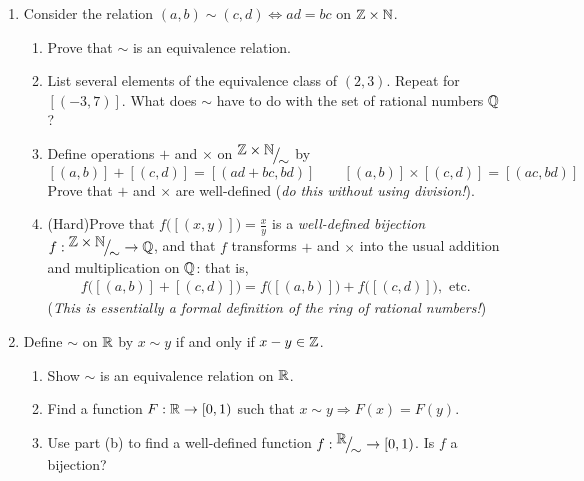\begin{exercises}{}{}
\begin{enumerate}
			
		\item\label{ex:qequiv} Consider the relation $(a,b)\sim(c,d)\iff ad=bc$ on $\mathbb{Z}\times\mathbb{N}$.
	  \begin{enumerate}
	    \item Prove that $\sim$ is an equivalence relation.
	    \item List several elements of the equivalence class of $(2,3)$. Repeat for  $[(-3,7)]$. What does $\sim$ have to do with the set of rational numbers $\mathbb{Q}$?
	    \item Define operations $+$ and $\times$ on ${}^{\textstyle {\mathbb{Z}\times\mathbb{N}}}\!\big/_{\textstyle \!{\sim}}$ by
	    \[
	    	[(a,b)]+[(c,d)]=[(ad+bc,bd)]\qquad [(a,b)]\times[(c,d)]=[(ac,bd)]
	    \]
	    Prove that $+$ and $\times$ are well-defined (\emph{do this without using division!}).
	    \item	(Hard)\lstsp Prove that $f\bigl([(x,y)]\bigr)=\frac xy$ is a \emph{well-defined bijection} $f:{}^{\textstyle {\mathbb{Z}\times\mathbb{N}}}\!\big/_{\textstyle \!{\sim}}\to\mathbb{Q}$, and that $f$ transforms $+$ and $\times$ into the usual addition and multiplication on $\mathbb{Q}$: that is,
			\begin{gather*}
				f\bigl([(a,b)]+[(c,d)]\bigr) = f\bigl([(a,b)]\bigr)+f\bigl([(c,d)]\bigr),\text{ \ etc.}
			\end{gather*}
			(\emph{This is essentially a formal definition of the ring of rational numbers!})
	  \end{enumerate}
	  
	  
	  
	
	
			
			
	
	\item Define $\sim$ on $\mathbb{R}$ by $x\sim y$ if and only if $x-y\in \mathbb{Z}$. 
	\begin{enumerate}
	    \item Show $\sim$ is an equivalence relation on $\mathbb{R}$.
	    \item Find a function $F:\mathbb{R}\to [0,1)$ such that $x\sim y \Longrightarrow F(x)=F(y)$.
	    \item Use part (b) to find a well-defined function $f:{}^{\textstyle {\mathbb{R}}}\!\big/_{\textstyle \!{\sim}} \to [0,1)$. Is $f$ a bijection?
	\end{enumerate}
	

\end{enumerate}
\end{exercises}

